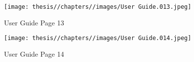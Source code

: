 \begin{figure} [H]
    \centering
    \texttt{[image: thesis//chapters//images/User Guide.013.jpeg]}
    \caption{User Guide Page 13}
    \label{fig:enter-label}
\end{figure}

\begin{figure} [H]
    \centering
    \texttt{[image: thesis//chapters//images/User Guide.014.jpeg]}
    \caption{User Guide Page 14}
    \label{fig:enter-label}
\end{figure}

